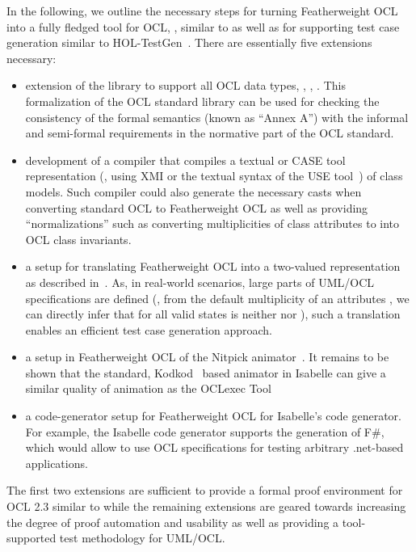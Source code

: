 \begin{enumerat}
In the following, we outline the necessary steps for turning
Featherweight OCL into a fully fledged tool for OCL, \eg, similar to
\holocl as well as for supporting test case generation similar to
{HOL}-TestGen~\cite{brucker.ea:hol-testgen:2009}.  There are
essentially five extensions necessary:
\begin{itemize}
\item extension of  the library to support all OCL data types, \eg,
  , . %
  This formalization of the OCL standard library can be used for
  checking the consistency of the formal semantics (known as ``Annex
  A'') with the informal and semi-formal requirements in the normative
  part of the OCL standard.
\item development of a compiler that compiles a textual or CASE
  tool representation (\eg, using XMI or the textual syntax of
  the USE tool~\cite{richters:precise:2002}) of class
  models. Such compiler could also generate the necessary casts when
  converting standard OCL to Featherweight OCL as well as providing
  ``normalizations'' such as converting multiplicities of class
  attributes to into OCL class invariants.
\item a setup for translating Featherweight OCL into a two-valued
  representation as described
  in~\cite{brucker.ea:ocl-testing:2010}. As, in real-world scenarios,
  large parts of {UML}/{OCL} specifications are defined (\eg,
  from the default multiplicity  of an attributes
  , we can directly infer that for all valid states
   is neither  nor ),
  such a translation enables an efficient test case generation
  approach.
\item a setup in Featherweight OCL of the Nitpick
  animator~\cite{blanchette.ea:nitpick:2010}. It remains to be shown
  that the standard, Kodkod~\cite{torlak.ea:kodkod:2007} based
  animator in Isabelle can give a similar quality of animation as the
  OCLexec Tool~\cite{krieger.ea:generative:2010}
\item a code-generator setup for Featherweight OCL for Isabelle's
  code generator. For example, the Isabelle code generator supports
  the generation of F\#, which would allow to use {OCL}
  specifications for testing arbitrary .net-based applications.
\end{itemize}
The first two extensions are sufficient to provide a formal proof
environment for OCL 2.3 similar to \holocl while the remaining
extensions are geared towards increasing the degree of proof
automation and usability as well as providing a tool-supported test
methodology for {UML}/{OCL}.



\end{enumerat}

